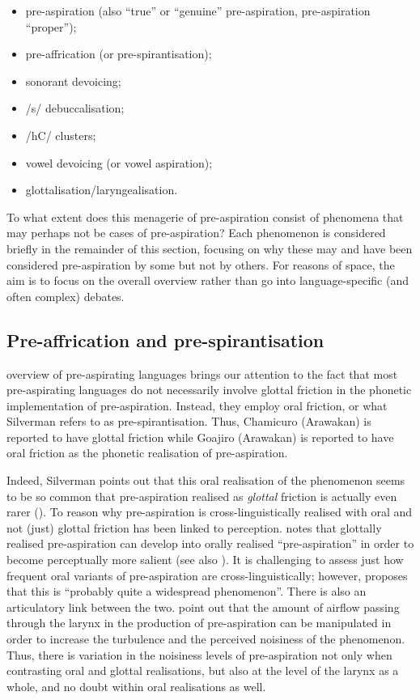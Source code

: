 \documentclass[output=paper]{langscibook}
\begin{document}
\begin{itemize}
\sloppy
\item pre\hyp aspiration (also “true” or “genuine” pre-aspiration, pre\hyp aspiration “proper”);
\item pre-affrication (or pre-spirantisation);
\item sonorant devoicing;
\item /s/ debuccalisation;
\item /hC/ clusters;
\item vowel devoicing (or vowel aspiration);
\item glottalisation\slash laryngealisation.
\end{itemize}

To what extent does this menagerie of pre\hyp aspiration consist of phenomena that may perhaps not be cases of pre-aspiration? Each phenomenon is considered briefly in the remainder of this section, focusing on why these may and have been considered pre\hyp aspiration by some but not by others. For reasons of space, the aim is to focus on the overall overview rather than go into language-specific (and often complex) debates.

\subsection{Pre-affrication and pre-spirantisation}\label{sec:hejna:2.1}

 overview of pre-aspirating languages brings our attention to the fact that most pre-aspirating languages do not necessarily involve glottal friction in the phonetic implementation of pre-aspiration. Instead, they employ oral friction, or what Silverman refers to as pre-spirantisation. Thus, Chamicuro (Arawakan) is reported to have glottal friction while Goajiro (Arawakan) is reported to have oral friction as the phonetic realisation of pre-aspiration. 

Indeed, Silverman points out that this oral realisation of the phenomenon seems to be so common that pre\hyp aspiration realised as \textit{glottal} friction is actually even rarer (\citeyear[575]{Silverman2003}). To reason why pre\hyp aspiration is cross-linguistically realised with oral and not (just) glottal friction has been linked to perception. \citet[575]{Silverman2003} notes that glottally realised pre\hyp aspiration can develop into orally realised “pre-aspiration” in order to become perceptually more salient (see also \cites[111--112]{Blevins2004}[1, 4, 57--58, 213]{Kehrein2002}). It is challenging to assess just how frequent oral variants of pre\hyp aspiration are cross-linguistically; however, \citet[117]{Clayton2010} proposes that this is “probably quite a widespread phenomenon”. There is also an articulatory link between the two. \citet[124]{EslingEtAl2019} point out that the amount of airflow passing through the larynx in the production of pre\hyp aspiration can be manipulated in order to increase the turbulence and the perceived noisiness of the phenomenon. Thus, there is variation in the noisiness levels of pre\hyp aspiration not only when contrasting oral and glottal realisations, but also at the level of the larynx as a whole, and no doubt within oral realisations as well.
\end{document}
